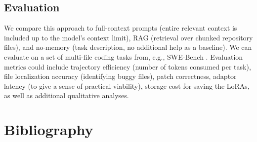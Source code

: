 \documentclass{article}
\begin{document}
\subsection{Evaluation}

We compare this approach to full-context prompts (entire relevant context is included up to the model's context limit), RAG (retrieval over chunked repository files), and no-memory (task description, no additional help as a baseline). We can evaluate on a set of multi-file coding tasks from, e.g., SWE-Bench \cite{jimenez2024swebenchlanguagemodelsresolve}. Evaluation metrics could include trajectory efficiency (number of tokens consumed per task), file localization accuracy (identifying buggy files), patch correctness, adaptor latency (to give a sense of practical viability), storage cost for saving the LoRAs, as well as additional qualitative analyses.

\section{Bibliography}

\printbibliography
\end{document}
